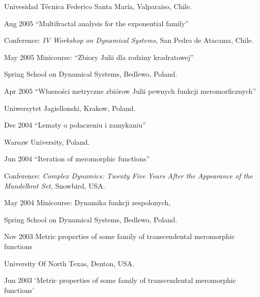 \documentclass{article}
\begin{document}
\begin{CV}
  Univesidad T\'ecnica Federico Santa Mar\'ia, Valparaiso, Chile.
\item[Aug 2005] ``Multifractal analysis for the exponential family''

  Conference: {\em IV Workshop on Dynamical Systems}, San Pedro de
  Atacama, Chile.
\item[May 2005] Minicourse: ``Zbiory Julii dla rodziny kradratowej''

  {Spring School on Dynamical Systems}, Bedlewo, Poland.
\item[Apr 2005] ``W{\l}asno{\'s}ci metryczne zbi{\'o}row Julii pewnych funkcji
  meromorficznych'' 
  
  Uniwersytet Jagiellonski, Krakow, Poland.
\item[Dec 2004] ``Lematy o po{\l}aczeniu i zamykaniu'' 
  
  Warsaw University, Poland.
\item[Jun 2004] ``Iteration of meromorphic functions''

  Conference: {\em Complex Dynamics: Twenty Five Years After the
    Appearance of the Mandelbrot Set,} Snowbird, USA.
\item[May 2004] Minicourse: Dynamika funkcji zespolonych,

  {Spring School on Dynamical Systems}, Bedlewo, Poland.


\item[Nov 2003] Metric properties of some family of transcendental
  meromorphic functions

  University Of North Texas, Denton, USA.
\item[Jun 2003] `Metric properties of some family of
  transcendental meromorphic functions' 


\end{CV}
\end{document}
